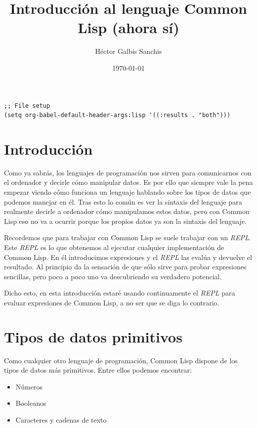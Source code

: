 \documentclass[11pt]{article}
\author{Héctor Galbis Sanchis}
\date{\today}
\title{Introducción al lenguaje Common Lisp (ahora sí)}
\begin{document}
\maketitle
\tableofcontents

\begin{verbatim}
;; File setup
(setq org-babel-default-header-args:lisp '((:results . "both")))
\end{verbatim}


\section{Introducción}
\label{sec:org04ca52c}

Como ya sabrás, los lenguajes de programación nos sirven para comunicarnos con el ordenador y decirle cómo manipular datos. Es por ello que siempre vale la pena empezar viendo cómo funciona un lenguaje hablando sobre los tipos de datos que podemos manejar en él. Tras esto lo común es ver la sintaxis del lenguaje para realmente decirle a ordenador cómo manipulamos estos datos, pero con Common Lisp eso no va a ocurrir porque los propios datos ya son la sintaxis del lenguaje.

Recordemos que para trabajar con Common Lisp se suele trabajar con un \emph{REPL}.  Este \emph{REPL} es lo que obtenemos al ejecutar cualquier implementación de Common Lisp. En él introducimos expresiones y el \emph{REPL} las evalúa y devuelve el resultado. Al principio da la sensación de que sólo sirve para probar expresiones sencillas, pero poco a poco uno va descubriendo su verdadero potencial.

Dicho esto, en esta introducción estaré usando continuamente el \emph{REPL} para evaluar expresiones de Common Lisp, a no ser que se diga lo contrario.


\section{Tipos de datos primitivos}
\label{sec:org7babcb4}

Como cualquier otro lenguaje de programación, Common Lisp dispone de los tipos de datos más primitivos. Entre ellos podemos encontrar:

\begin{itemize}
\item Números
\item Booleanos
\item Caracteres y cadenas de texto
\end{itemize}
\end{document}
